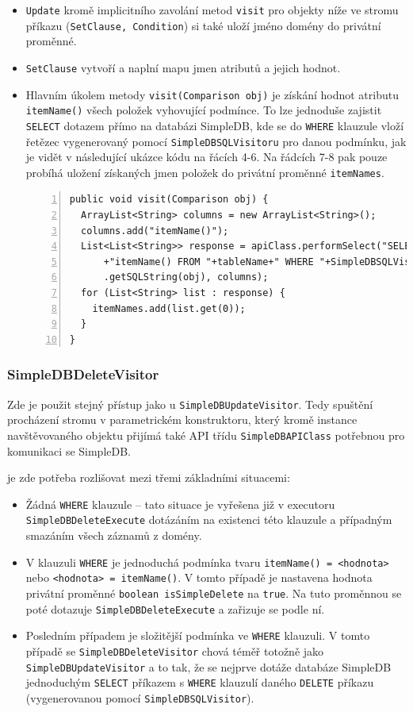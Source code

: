 \documentclass[oneside,12pt,final]{fithesis2}
\begin{document}
\begin{itemize}
 \item \texttt{Update} kromě implicitního zavolání metod \texttt{visit} pro objekty níže ve stromu příkazu (\texttt{SetClause, Condition}) si také uloží jméno domény do privátní proměnné.
 \item \texttt{SetClause} vytvoří a naplní mapu jmen atributů a jejich hodnot.
 \item Hlavním úkolem metody \texttt{visit(Comparison obj)} je získání hodnot atributu \texttt{itemName()} všech položek vyhovující podmínce. To lze jednoduše zajistit \texttt{SELECT} dotazem přímo na databázi SimpleDB, kde se do \texttt{WHERE} klauzule vloží řetězec vygenerovaný pomocí \texttt{SimpleDBSQLVisitoru} pro danou podmínku, jak je vidět v následující ukázce kódu na řácích 4-6. Na řádcích 7-8 pak pouze probíhá uložení získaných jmen položek do privátní proměnné \texttt{itemNames}.
 \begin{Verbatim}[fontsize=\small,numbers=left]
public void visit(Comparison obj) {
  ArrayList<String> columns = new ArrayList<String>();
  columns.add("itemName()");
  List<List<String>> response = apiClass.performSelect("SELECT "
      +"itemName() FROM "+tableName+" WHERE "+SimpleDBSQLVisitor
      .getSQLString(obj), columns);
  for (List<String> list : response) {
    itemNames.add(list.get(0));
  }
}
 \end{Verbatim}
\end{itemize}

\subsubsection{SimpleDBDeleteVisitor}
Zde je použit stejný přístup jako u \texttt{SimpleDBUpdateVisitor}. Tedy spuštění procházení stromu v parametrickém konstruktoru, který kromě instance navštěvovaného objektu přijímá také API třídu \texttt{SimpleDBAPIClass} potřebnou pro komunikaci se SimpleDB.

je zde potřeba rozlišovat mezi třemi základními situacemi:
\begin{itemize}
 \item Žádná \texttt{WHERE} klauzule -- tato situace je vyřešena již v executoru \texttt{SimpleDBDeleteExecute} dotázáním na existenci této klauzule a případným smazáním všech záznamů z domény.
 \item V klauzuli \texttt{WHERE} je jednoduchá podmínka tvaru \texttt{itemName() = <hodnota>} nebo \texttt{<hodnota> = itemName()}. V tomto případě je nastavena hodnota privátní proměnné \texttt{boolean isSimpleDelete} na \texttt{true}. Na tuto proměnnou se poté dotazuje \texttt{SimpleDBDeleteExecute} a zařizuje se podle ní.
 \item Posledním případem je složitější podmínka ve \texttt{WHERE} klauzuli. V tomto případě se \texttt{SimpleDBDeleteVisitor} chová téměř totožně jako \texttt{SimpleDBUpdateVisitor} a to tak, že se nejprve dotáže databáze SimpleDB jednoduchým \texttt{SELECT} příkazem s \texttt{WHERE} klauzulí daného \texttt{DELETE} příkazu (vygenerovanou pomocí \texttt{SimpleDBSQL\allowbreak Visitor}).
\end{itemize}
\end{document}
